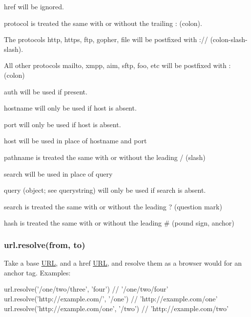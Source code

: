 \begin{DoxyItemize}
\item {\ttfamily href} will be ignored.
\item {\ttfamily protocol} is treated the same with or without the trailing {\ttfamily \+:} (colon).
\begin{DoxyItemize}
\item The protocols {\ttfamily http}, {\ttfamily https}, {\ttfamily ftp}, {\ttfamily gopher}, {\ttfamily file} will be postfixed with {\ttfamily \+://} (colon-\/slash-\/slash).
\item All other protocols {\ttfamily mailto}, {\ttfamily xmpp}, {\ttfamily aim}, {\ttfamily sftp}, {\ttfamily foo}, etc will be postfixed with {\ttfamily \+:} (colon)
\end{DoxyItemize}
\item {\ttfamily auth} will be used if present.
\item {\ttfamily hostname} will only be used if {\ttfamily host} is absent.
\item {\ttfamily port} will only be used if {\ttfamily host} is absent.
\item {\ttfamily host} will be used in place of {\ttfamily hostname} and {\ttfamily port}
\item {\ttfamily pathname} is treated the same with or without the leading {\ttfamily /} (slash)
\item {\ttfamily search} will be used in place of {\ttfamily query}
\item {\ttfamily query} (object; see {\ttfamily querystring}) will only be used if {\ttfamily search} is absent.
\item {\ttfamily search} is treated the same with or without the leading {\ttfamily ?} (question mark)
\item {\ttfamily hash} is treated the same with or without the leading {\ttfamily \#} (pound sign, anchor)
\end{DoxyItemize}

\subsubsection*{url.\+resolve(from, to)}

Take a base \mbox{\hyperlink{namespace_u_r_l}{U\+RL}}, and a href \mbox{\hyperlink{namespace_u_r_l}{U\+RL}}, and resolve them as a browser would for an anchor tag. Examples\+: \begin{DoxyVerb}url.resolve('/one/two/three', 'four')         // '/one/two/four'
url.resolve('http://example.com/', '/one')    // 'http://example.com/one'
url.resolve('http://example.com/one', '/two') // 'http://example.com/two'\end{DoxyVerb}
 